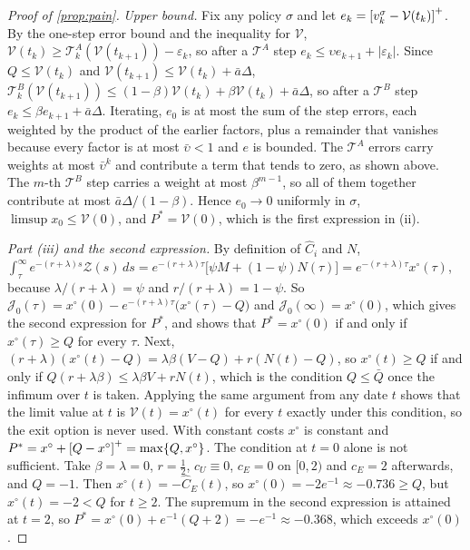 \begin{proof}[Proof of \cref{prop:pain}]
\emph{Upper bound.} Fix any policy $\sigma$ and let $e_k=\left[v^\sigma_k-\mathcal V(t_k)\right]^{+}$. By the one-step error bound and the inequality for $\mathcal V$, $\mathcal V(t_k)\ge\mathcal T^A_k(\mathcal V(t_{k+1}))-\varepsilon_k$, so after a $\mathcal T^A$ step $e_k\le\upsilon e_{k+1}+|\varepsilon_k|$. Since $Q\le\mathcal V(t_k)$ and $\mathcal V(t_{k+1})\le\mathcal V(t_k)+\bar a\Delta$, $\mathcal T^B_k(\mathcal V(t_{k+1}))\le(1-\beta)\mathcal V(t_k)+\beta\mathcal V(t_k)+\bar a\Delta$, so after a $\mathcal T^B$ step $e_k\le\beta e_{k+1}+\bar a\Delta$. Iterating, $e_0$ is at most the sum of the step errors, each weighted by the product of the earlier factors, plus a remainder that vanishes because every factor is at most $\bar\upsilon<1$ and $e$ is bounded. The $\mathcal T^A$ errors carry weights at most $\bar\upsilon^k$ and contribute a term that tends to zero, as shown above. The $m$-th $\mathcal T^B$ step carries a weight at most $\beta^{m-1}$, so all of them together contribute at most $\bar a\Delta/(1-\beta)$. Hence $e_0\to 0$ uniformly in $\sigma$, $\limsup x_0\le\mathcal V(0)$, and $P^*=\mathcal V(0)$, which is the first expression in (ii).

\emph{Part (iii) and the second expression.} By definition of $\hat C_i$ and $N$, $\int_\tau^\infty e^{-(r+\lambda)s}\mathcal Z(s)\,ds=e^{-(r+\lambda)\tau}\big[\psi M+(1-\psi)N(\tau)\big]=e^{-(r+\lambda)\tau}x^\circ(\tau)$, because $\lambda/(r+\lambda)=\psi$ and $r/(r+\lambda)=1-\psi$. So $\mathcal J_0(\tau)=x^\circ(0)-e^{-(r+\lambda)\tau}\big(x^\circ(\tau)-Q\big)$ and $\mathcal J_0(\infty)=x^\circ(0)$, which gives the second expression for $P^*$, and shows that $P^*=x^\circ(0)$ if and only if $x^\circ(\tau)\ge Q$ for every $\tau$. Next, $(r+\lambda)(x^\circ(t)-Q)=\lambda\beta(V-Q)+r(N(t)-Q)$, so $x^\circ(t)\ge Q$ if and only if $Q(r+\lambda\beta)\le\lambda\beta V+rN(t)$, which is the condition $Q\le\bar Q$ once the infimum over $t$ is taken. Applying the same argument from any date $t$ shows that the limit value at $t$ is $\mathcal V(t)=x^\circ(t)$ for every $t$ exactly under this condition, so the exit option is never used. With constant costs $x^\circ$ is constant and $P^*=x^\circ+\left[Q-x^\circ\right]^{+}=\max\{Q,x^\circ\}$.
The condition at $t=0$ alone is not sufficient. Take $\beta=\lambda=0$, $r=\tfrac12$, $c_U\equiv 0$, $c_E=0$ on $[0,2)$ and $c_E=2$ afterwards, and $Q=-1$. Then $x^\circ(t)=-\hat C_E(t)$, so $x^\circ(0)=-2e^{-1}\approx-0.736\ge Q$, but $x^\circ(t)=-2<Q$ for $t\ge 2$. The supremum in the second expression is attained at $t=2$, so $P^*=x^\circ(0)+e^{-1}(Q+2)=-e^{-1}\approx-0.368$, which exceeds $x^\circ(0)$.
\end{proof}

